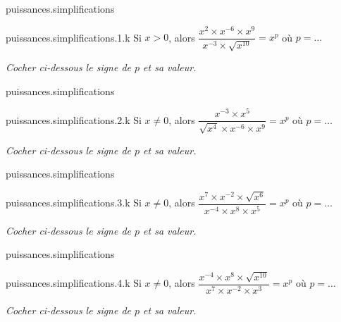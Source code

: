 \begin{qcm}{puissances.simplifications}
    \begin{questionmult}{puissances.simplifications.1.k}
	Si \(x>0\), alors \(\dfrac{x^2\times x^{-6} \times x^9}{x^{-3}\times {\sqrt{x^{10}}}}=x^p\) où \(p=\ldots\)
	
	\noindent\textit{Cocher ci-dessous le signe de \(p\) et sa valeur.}
	\vspace{-1.2ex}
	\footnotesize{
	 }
    \end{questionmult}
\end{qcm}

\begin{qcm}{puissances.simplifications}
    \begin{questionmult}{puissances.simplifications.2.k}
	Si \(x \neq 0\), alors \(\dfrac{x^{-3}\times x^5}{{\sqrt{x^4}}\times x^{-6} \times x^9}=x^p\) où \(p=\ldots\)
    
    \noindent\textit{Cocher ci-dessous le signe de \(p\) et sa valeur.}
    \vspace{-1.2ex}
    \footnotesize{
    }
    \end{questionmult}
\end{qcm}

\begin{qcm}{puissances.simplifications}
    \begin{questionmult}{puissances.simplifications.3.k}
	Si \(x \neq 0\), alors \(\dfrac{x^7\times x^{-2} \times {\sqrt{x^6}}}{x^{-4}\times x^8 \times x^5}=x^p\) où \(p=\ldots\)
    
    \noindent\textit{Cocher ci-dessous le signe de \(p\) et sa valeur.}
    \vspace{-1.2ex}
    \footnotesize{
    	  }
    \end{questionmult}
\end{qcm}

\begin{qcm}{puissances.simplifications}
    \begin{questionmult}{puissances.simplifications.4.k}
	Si \(x \neq 0\), alors \(\dfrac{x^{-4}\times x^8 \times {\sqrt{x^{10}}}}{x^7\times x^{-2} \times x^3}=x^p\) où \(p=\ldots\)
    
    \noindent\textit{Cocher ci-dessous le signe de \(p\) et sa valeur.}
    \vspace{-1.2ex}
    \footnotesize{
    	  }
    \end{questionmult}
\end{qcm}

